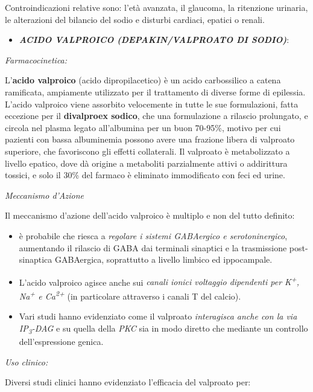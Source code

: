 \documentclass[]{article}
\begin{document}
Controindicazioni relative sono: l'età avanzata, il glaucoma, la
ritenzione urinaria, le alterazioni del bilancio del sodio e disturbi
cardiaci, epatici o renali.

\begin{itemize}
\item
  \textbf{\emph{ACIDO VALPROICO (DEPAKIN/VALPROATO DI SODIO)}}:
\end{itemize}

\emph{\emph{Farmacocinetica:}}

L'\textbf{acido valproico} (acido dipropilacetico) è un acido
carbossilico a catena ramificata, ampiamente utilizzato per il
trattamento di diverse forme di epilessia. L'acido valproico viene
assorbito velocemente in tutte le sue formulazioni, fatta eccezione per
il \textbf{divalproex sodico}, che una formulazione a rilascio
prolungato, e circola nel plasma legato all'albumina per un buon
70-95\%, motivo per cui pazienti con bassa albuminemia possono avere una
frazione libera di valproato superiore, che favoriscono gli effetti
collaterali. Il valproato è metabolizzato a livello epatico, dove dà
origine a metaboliti parzialmente attivi o addirittura tossici, e solo
il 30\% del farmaco è eliminato immodificato con feci ed urine.

\emph{\emph{Meccanismo d'Azione}}

Il meccanismo d'azione dell'acido valproico è multiplo e non del tutto
definito:

\begin{itemize}
\item
  è probabile che riesca a \emph{regolare i sistemi GABAergico e
  serotoninergico}, aumentando il rilascio di GABA dai terminali
  sinaptici e la trasmissione post-sinaptica GABAergica, soprattutto a
  livello limbico ed ippocampale.
\item
  L'acido valproico agisce anche sui \emph{canali ionici voltaggio
  dipendenti per K\textsuperscript{+}, Na\textsuperscript{+} e
  Ca\textsuperscript{2+}} (in particolare attraverso i canali T del
  calcio).
\item
  Vari studi hanno evidenziato come il valproato \emph{interagisca anche
  con la via IP\textsubscript{3}-DAG} e su quella della \emph{PKC} sia
  in modo diretto che mediante un controllo dell'espressione genica.
\end{itemize}

\emph{\emph{Uso clinico:}}

Diversi studi clinici hanno evidenziato l'efficacia del valproato per:
\end{document}
